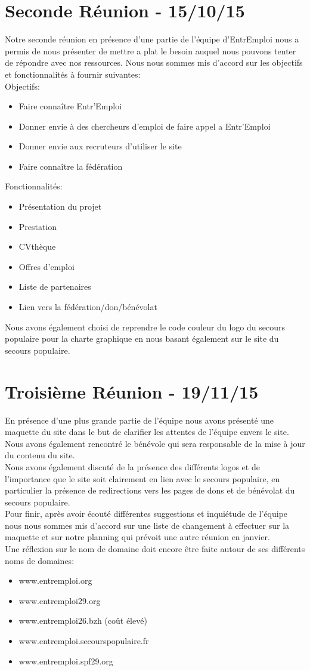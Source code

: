 \documentclass[a4paper, 12pt]{report}
\begin{document}
\section{Seconde Réunion - 15/10/15}
Notre seconde réunion en présence d'une partie de l'équipe d'EntrEmploi nous a permis de nous présenter de mettre a plat le besoin auquel nous pouvons tenter de répondre avec nos ressources. Nous nous sommes mis d'accord sur les objectifs et fonctionnalités à fournir suivantes:\\
Objectifs:
\begin{itemize}
    \item Faire connaître Entr'Emploi
    \item Donner envie à des chercheurs d'emploi de faire appel a Entr'Emploi
    \item Donner envie aux recruteurs d'utiliser le site
    \item Faire connaître la fédération
\end{itemize}
Fonctionnalités:
\begin{itemize}
    \item Présentation du projet
    \item Prestation
    \item CVthèque
    \item Offres d'emploi
    \item Liste de partenaires
    \item Lien vers la fédération/don/bénévolat
\end{itemize}
Nous avons également choisi de reprendre le code couleur du logo du secours populaire pour la charte graphique en nous basant également sur le site du secours populaire.
\section{Troisième Réunion - 19/11/15}
En présence d'une plus grande partie de l'équipe nous avons présenté une maquette du site dans le but de clarifier les attentes de l'équipe envers le site. Nous avons également rencontré le bénévole qui sera responsable de la mise à jour du contenu du site.\\
Nous avons également discuté de la présence des différents logos et de l'importance que le site soit clairement en lien avec le secours populaire, en particulier la présence de redirections vers les pages de dons et de bénévolat du secours populaire.\\
Pour finir, après avoir écouté différentes suggestions et inquiétude de l'équipe nous nous sommes mis d'accord sur une liste de changement à effectuer sur la maquette et sur notre planning qui prévoit une autre réunion en janvier.\\
Une réflexion sur le nom de domaine doit encore être faite autour de ses différents noms de domaines:
\begin{itemize}
    \item www.entremploi.org
    \item www.entremploi29.org
    \item www.entremploi26.bzh (coût élevé)
    \item www.entremploi.secourspopulaire.fr
    \item www.entremploi.spf29.org
\end{itemize}
\end{document}
